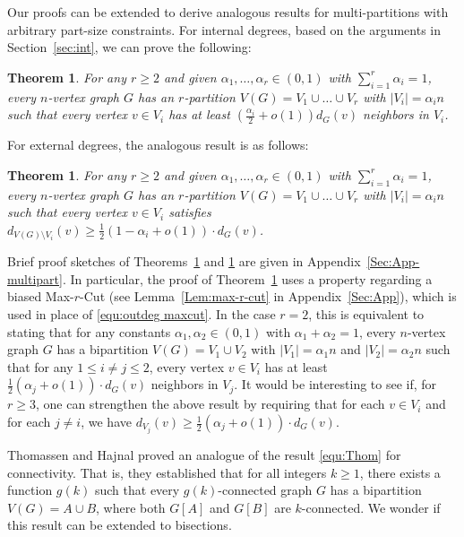 \documentclass{aic}
\newtheorem{theorem}[dfn]{Theorem}
\begin{document}
	
	
	Our proofs can be extended to derive analogous results for multi-partitions with arbitrary part-size constraints. For internal degrees, based on the arguments in Section~\ref{sec:int}, we can prove the following:
	\begin{theorem}\label{Thm:int-multipart}
		For any $r \geq 2$ and given $\alpha_1, \ldots, \alpha_r \in (0,1)$ with $\sum_{i=1}^r \alpha_i = 1$, every $n$-vertex graph $G$ has an $r$-partition $V(G) = V_1 \cup \ldots \cup V_r$ with $|V_i| = \alpha_i n$ such that every vertex $v\in V_i$ has at least $\left(\frac{\alpha_i}{2} + o(1)\right) d_G(v)$ neighbors in $V_i$.
	\end{theorem}
	\noindent For external degrees, the analogous result is as follows:
	\begin{theorem}\label{Thm:ext-remark}
		For any $r \geq 2$ and given $\alpha_1, \ldots, \alpha_r \in (0,1)$ with $\sum_{i=1}^r \alpha_i = 1$, every $n$-vertex graph $G$ has an $r$-partition $V(G) = V_1 \cup \ldots \cup V_r$ with $|V_i| = \alpha_i n$ such that every vertex $v \in V_i$ satisfies $d_{V(G) \setminus V_i}(v) \geq \frac{1}{2}(1 - \alpha_i + o(1)) \cdot d_G(v)$.
	\end{theorem}
	\noindent Brief proof sketches of Theorems~\ref{Thm:int-multipart} and \ref{Thm:ext-remark} are given in Appendix~\ref{Sec:App-multipart}.
	In particular, the proof of Theorem~\ref{Thm:ext-remark} uses a property regarding a biased Max-$r$-Cut (see Lemma~\ref{Lem:max-r-cut} in Appendix~\ref{Sec:App}), which is used in place of \eqref{equ:outdeg maxcut}.
	In the case $r = 2$, this is equivalent to stating that for any constants $\alpha_1, \alpha_2 \in (0,1)$ with $\alpha_1 + \alpha_2 = 1$,
	every $n$-vertex graph $G$ has a bipartition $V(G) = V_1 \cup V_2$ with $|V_1| = \alpha_1 n$ and $|V_2| = \alpha_2 n$ such that for any $1\leq i\neq j\leq 2$,
	every vertex $v\in V_i$ has at least $\frac{1}{2}(\alpha_j + o(1)) \cdot d_G(v)$ neighbors in $V_j$.
	It would be interesting to see if, for $r \geq 3$, one can strengthen the above result by requiring that for each $v \in V_i$ and for each $j \neq i$, we have $d_{V_j}(v) \geq \frac{1}{2}(\alpha_j + o(1)) \cdot d_G(v)$.
	
	Thomassen \cite{T83} and Hajnal \cite{Haj} proved an analogue of the result \eqref{equ:Thom} for connectivity.
	That is, they established that for all integers $k\geq 1$, there exists a function $g(k)$ such that
	every $g(k)$-connected graph $G$ has a bipartition $V(G)=A\cup B$, where both $G[A]$ and $G[B]$ are $k$-connected.
	We wonder if this result can be extended to bisections.
	
\end{document}
